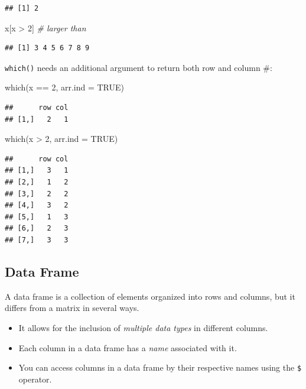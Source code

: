 \documentclass[
]{article}
\newenvironment{Shaded}{\begin{snugshade}}{\end{snugshade}}
\newcommand{\AttributeTok}[1]{\textcolor[rgb]{0.77,0.63,0.00}{#1}}
\newcommand{\CommentTok}[1]{\textcolor[rgb]{0.56,0.35,0.01}{\textit{#1}}}
\newcommand{\ConstantTok}[1]{\textcolor[rgb]{0.00,0.00,0.00}{#1}}
\newcommand{\DecValTok}[1]{\textcolor[rgb]{0.00,0.00,0.81}{#1}}
\newcommand{\FunctionTok}[1]{\textcolor[rgb]{0.00,0.00,0.00}{#1}}
\newcommand{\NormalTok}[1]{#1}
\newcommand{\SpecialCharTok}[1]{\textcolor[rgb]{0.00,0.00,0.00}{#1}}
\providecommand{\tightlist}{%
  \setlength{\itemsep}{0pt}\setlength{\parskip}{0pt}}
\begin{document}
\begin{verbatim}
## [1] 2
\end{verbatim}

\begin{Shaded}
\begin{Highlighting}[]
\NormalTok{x[x }\SpecialCharTok{\textgreater{}} \DecValTok{2}\NormalTok{] }\CommentTok{\# larger than}
\end{Highlighting}
\end{Shaded}

\begin{verbatim}
## [1] 3 4 5 6 7 8 9
\end{verbatim}

\texttt{which()} needs an additional argument to return both row and column \#:

\begin{Shaded}
\begin{Highlighting}[]
\FunctionTok{which}\NormalTok{(x }\SpecialCharTok{==} \DecValTok{2}\NormalTok{, }\AttributeTok{arr.ind =} \ConstantTok{TRUE}\NormalTok{)}
\end{Highlighting}
\end{Shaded}

\begin{verbatim}
##      row col
## [1,]   2   1
\end{verbatim}

\begin{Shaded}
\begin{Highlighting}[]
\FunctionTok{which}\NormalTok{(x }\SpecialCharTok{\textgreater{}} \DecValTok{2}\NormalTok{, }\AttributeTok{arr.ind =} \ConstantTok{TRUE}\NormalTok{)}
\end{Highlighting}
\end{Shaded}

\begin{verbatim}
##      row col
## [1,]   3   1
## [2,]   1   2
## [3,]   2   2
## [4,]   3   2
## [5,]   1   3
## [6,]   2   3
## [7,]   3   3
\end{verbatim}

\hypertarget{data-frame}{%
\subsection{Data Frame}\label{data-frame}}

A data frame is a collection of elements organized into rows and columns, but it differs from a matrix in several ways.

\begin{itemize}
\tightlist
\item
  It allows for the inclusion of \emph{multiple data types} in different columns.
\item
  Each column in a data frame has a \emph{name} associated with it.
\item
  You can access columns in a data frame by their respective names using the \texttt{\$} operator.
\end{itemize}
\end{document}
